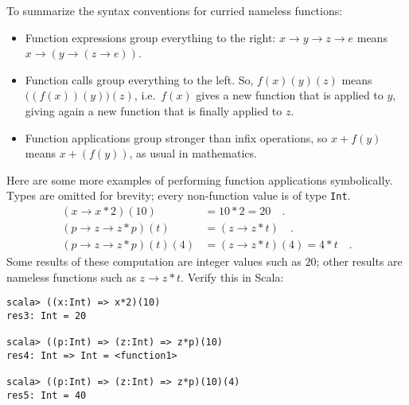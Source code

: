 To summarize the syntax conventions for curried nameless functions:
\begin{itemize}
\item Function expressions group everything to the right: $x\rightarrow y\rightarrow z\rightarrow e$
means $x\rightarrow\left(y\rightarrow\left(z\rightarrow e\right)\right)$.
\item Function calls group everything to the left. So, $f(x)(y)(z)$ means
$\big((f(x))(y)\big)(z)$, i.e.~$f(x)$ gives a new function that
is applied to $y$, giving again a new function that is finally applied
to $z$.
\item Function applications group stronger than infix operations, so $x+f(y)$
means $x+(f(y))$, as usual in mathematics.
\end{itemize}
Here are some more examples of performing function applications symbolically.
Types are omitted for brevity; every non-function value is of type
\texttt{}\lstinline!Int!.
\begin{align*}
\left(x\rightarrow x*2\right)(10) & =10*2=20\quad.\\
\left(p\rightarrow z\rightarrow z*p\right)\left(t\right) & =(z\rightarrow z*t)\quad.\\
\left(p\rightarrow z\rightarrow z*p\right)(t)(4) & =(z\rightarrow z*t)(4)=4*t\quad.
\end{align*}
Some results of these computation are integer values such as $20$;
other results are nameless functions such as $z\rightarrow z*t$.
Verify this in Scala:
\begin{lstlisting}
scala> ((x:Int) => x*2)(10)
res3: Int = 20

scala> ((p:Int) => (z:Int) => z*p)(10)
res4: Int => Int = <function1>

scala> ((p:Int) => (z:Int) => z*p)(10)(4)
res5: Int = 40 
\end{lstlisting}

